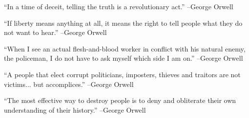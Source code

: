 \documentclass{article}%
\begin{document}
\begin{minipage}{\textwidth}%
\flushleft%
“In a time of deceit, telling the truth is a revolutionary act.”%
\linebreak%
\vspace{1mm}%
–George Orwell%
\linebreak%
\vspace{1mm}%
\end{minipage}%
\linebreak%
\vspace{1mm}%
\begin{minipage}{\textwidth}%
\flushleft%
“If liberty means anything at all, it means the right to tell people what they do not want to hear.”%
\linebreak%
\vspace{1mm}%
–George Orwell%
\linebreak%
\vspace{1mm}%
\end{minipage}%
\linebreak%
\vspace{1mm}%
\begin{minipage}{\textwidth}%
\flushleft%
“When I see an actual flesh{-}and{-}blood worker in conflict with his natural enemy, the policeman, I do not have to ask myself which side I am on.”%
\linebreak%
\vspace{1mm}%
–George Orwell%
\linebreak%
\vspace{1mm}%
\end{minipage}%
\linebreak%
\vspace{1mm}%
\begin{minipage}{\textwidth}%
\flushleft%
“A people that elect corrupt politicians, imposters, thieves and traitors are not victims... but accomplices.”%
\linebreak%
\vspace{1mm}%
–George Orwell%
\linebreak%
\vspace{1mm}%
\end{minipage}%
\linebreak%
\vspace{1mm}%
\begin{minipage}{\textwidth}%
\flushleft%
“The most effective way to destroy people is to deny and obliterate their own understanding of their history.”%
\linebreak%
\vspace{1mm}%
–George Orwell%
\linebreak%
\vspace{1mm}%
\end{minipage}%
\end{document}
